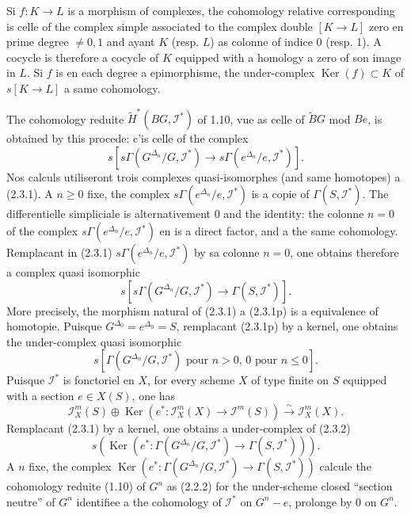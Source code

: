 \documentclass[11pt,a4paper]{article}
\theoremstyle{plain}
\theoremstyle{definition}
\DeclareMathOperator{\Ker}{Ker}
\begin{document}
Si $f : K \to L$ is a morphism of complexes, the cohomology relative corresponding is celle of the complex simple associated to the complex double $[K \to L]$ zero en prime degree $\neq 0, 1$ and ayant $K$ (resp. $L$) as colonne of indice 0 (resp. 1). A cocycle is therefore a cocycle of $K$ equipped with a homology a zero of son image in $L$. Si $f$ is en each degree a epimorphisme, the under-complex $\Ker(f) \subset K$ of $s[K \to L]$ a same cohomology.

The cohomology reduite $\widetilde{H}^*(BG, \mathscr{I}^*)$ of 1.10, vue as celle of $\widetilde{B}G$ mod $Be$, is obtained by this procede: c'is celle of the complex
\begin{equation}\label{2.3.1}
s[s\Gamma(G^{\Delta_n}/G, \mathscr{I}^*) \to s\Gamma(e^{\Delta_n}/e, \mathscr{I}^*)].
\end{equation}
Nos calculs utiliseront trois complexes quasi-isomorphes (and same homotopes) a (2.3.1). A $n \geq 0$ fixe, the complex $s\Gamma(e^{\Delta_n}/e, \mathscr{I}^*)$ is a copie of $\Gamma(S, \mathscr{I}^*)$. The differentielle simpliciale is alternativement 0 and the identity: the colonne $n = 0$ of the complex $s\Gamma(e^{\Delta_n}/e, \mathscr{I}^*)$ en is a direct factor, and a the same cohomology. Remplacant in (2.3.1) $s\Gamma(e^{\Delta_n}/e, \mathscr{I}^*)$ by sa colonne $n = 0$, one obtains therefore a complex quasi isomorphic
\begin{equation}\label{2.3.1p}
s[s\Gamma(G^{\Delta_n}/G, \mathscr{I}^*) \to \Gamma(S, \mathscr{I}^*)].
\end{equation}
More precisely, the morphism natural of (2.3.1) a (2.3.1p) is a equivalence of homotopie. Puisque $G^{\Delta_0} = e^{\Delta_0} = S$, remplacant (2.3.1p) by a kernel, one obtains the under-complex quasi isomorphic
\begin{equation}\label{2.3.2}
s[\Gamma(G^{\Delta_n}/G, \mathscr{I}^*) \text{ pour } n > 0, \, 0 \text{ pour } n \leq 0].
\end{equation}
Puisque $\mathscr{I}^*$ is fonctoriel en $X$, for every scheme $X$ of type finite on $S$ equipped with a section $e \in X(S)$, one has
\[
\mathscr{I}_X^m(S) \oplus \Ker(e^* : \mathscr{I}_X^m(X) \to \mathscr{I}^m(S)) \xrightarrow{\sim} \mathscr{I}_X^m(X).
\]
Remplacant (2.3.1) by a kernel, one obtains a under-complex of (2.3.2)
\begin{equation}\label{2.3.3}
s(\Ker(e^* : \Gamma(G^{\Delta_n}/G, \mathscr{I}^*) \to \Gamma(S, \mathscr{I}^*))).
\end{equation}
A $n$ fixe, the complex $\Ker(e^* : \Gamma(G^{\Delta_n}/G, \mathscr{I}^*) \to \Gamma(S, \mathscr{I}^*))$ calcule the cohomology reduite (1.10) of $G^n$ as (2.2.2) for the under-scheme closed ``section neutre'' of $G^n$ identifiee a the cohomology of $\mathscr{I}^*$ on $G^n - e$, prolonge by 0 on $G^n$.
\end{document}
